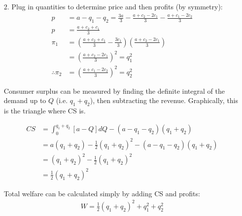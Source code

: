 \documentclass[12pt,letterpaper]{article}
\begin{document}
\begin{enumerate}
\begin{enumerate}
    \item[2.] Plug in quantities to determine price and then profits (by symmetry):
    \begin{align*}
        p &= a - q_1 - q_2 = \frac{3a}{3} - \frac{a + c_2 - 2c_1}{3} - \frac{a + c_1 - 2c_2}{3} \\
        p &= \frac{a + c_2 + c_1}{3} \\
        \pi_1 &= (\frac{a + c_2 + c_1}{3} - \frac{3c_1}{3})(\frac{a + c_2 - 2c_1}{3}) \\
        &= (\frac{a + c_2 - 2c_1}{3})^2 = q_1^2\\
        \therefore \pi_2 &= (\frac{a + c_1 - 2c_2}{3})^2 = q_2^2
    \end{align*} 

    Consumer surplus can be measured by finding the definite integral of the demand up to $Q$ (i.e. $q_1 + q_2$), then subtracting the revenue. Graphically, this is the triangle where CS is.

    \begin{align*}
        CS &= \int_0^{q_1 + q_2}[a - Q]dQ - (a - q_1 - q_2)(q_1 + q_2) \\
        &= a(q_1+q_2) - \frac{1}{2}(q_1 + q_2)^2 - (a - q_1 - q_2)(q_1 + q_2) \\
        &= (q_1 + q_2)^2 - \frac{1}{2}(q_1 + q_2)^2 \\
        &= \frac{1}{2}(q_1 + q_2)^2
    \end{align*}
     
    Total welfare can be calculated simply by adding CS and profits:
    \begin{align*}
        W = \frac{1}{2}(q_1 + q_2)^2 + q_1^2 + q_2^2
    \end{align*}


\end{enumerate}
\end{enumerate}
\end{document}
